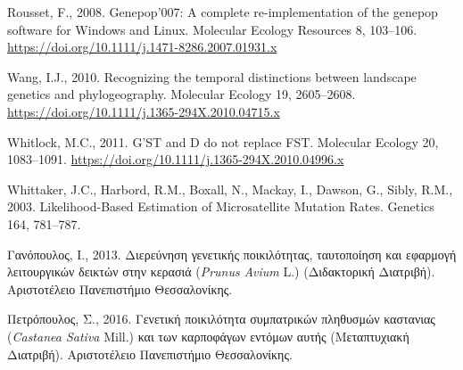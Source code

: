 \documentclass[12pt,a4paper,]{report}
\begin{document}
\leavevmode\hypertarget{ref-Rousset2008}{}%
Rousset, F., 2008. Genepop'007: A complete re-implementation of the
genepop software for Windows and Linux. Molecular Ecology Resources 8,
103--106. \url{https://doi.org/10.1111/j.1471-8286.2007.01931.x}

\leavevmode\hypertarget{ref-Wang2010a}{}%
Wang, I.J., 2010. Recognizing the temporal distinctions between
landscape genetics and phylogeography. Molecular Ecology 19, 2605--2608.
\url{https://doi.org/10.1111/j.1365-294X.2010.04715.x}

\leavevmode\hypertarget{ref-whitlock_gst_2011}{}%
Whitlock, M.C., 2011. G'ST and D do not replace FST. Molecular Ecology
20, 1083--1091. \url{https://doi.org/10.1111/j.1365-294X.2010.04996.x}

\leavevmode\hypertarget{ref-whittaker_likelihood-based_2003}{}%
Whittaker, J.C., Harbord, R.M., Boxall, N., Mackay, I., Dawson, G.,
Sibly, R.M., 2003. Likelihood-Based Estimation of Microsatellite
Mutation Rates. Genetics 164, 781--787.

\leavevmode\hypertarget{ref-__2013}{}%
Γανόπουλος, Ι., 2013. Διερεύνηση γενετικής ποικιλότητας, ταυτοποίηση και
εφαρμογή λειτουργικών δεικτών στην κερασιά (\emph{Prunus} \emph{Avium}
L.) (Διδακτορική Διατριβή). Αριστοτέλειο Πανεπιστήμιο Θεσσαλονίκης.

\leavevmode\hypertarget{ref-2016a}{}%
Πετρόπουλος, Σ., 2016. Γενετική ποικιλότητα συμπατρικών πληθυσμών
καστανιας (\emph{Castanea Sativa} Mill.) και των καρποφάγων εντόμων
αυτής (Mεταπτυχιακή Διατριβή). Αριστοτέλειο Πανεπιστήμιο Θεσσαλονίκης.
\end{document}
